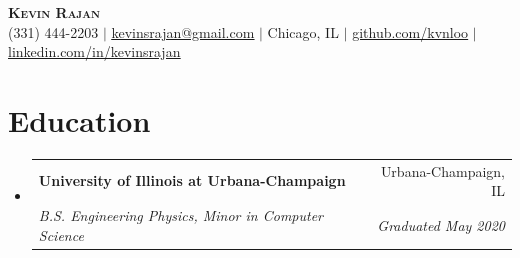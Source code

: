 \documentclass[letterpaper,11pt]{article}
\makeatletter
\newcommand{\resumeSubheading}[4]{%
  \vspace{-2pt}\item
    \begin{tabular*}{0.97\textwidth}[t]{l@{\extracolsep{\fill}}r}
      \textbf{#1} & #2 \\
      \textit{\small#3} & \textit{\small #4} \\
    \end{tabular*}\vspace{-7pt}
}
\newcommand{\resumeSubHeadingListStart}{\begin{itemize}[leftmargin=0.15in, label={}]}
\newcommand{\resumeSubHeadingListEnd}{\end{itemize}}
\makeatother
\begin{document}
\begin{center}
    \textbf{\Huge \scshape Kevin Rajan} \\ \vspace{1pt}
    \small (331) 444-2203 $|$
    \href{mailto:kevinsrajan@gmail.com}{\underline{kevinsrajan@gmail.com}} $|$
    Chicago, IL $|$
    \href{https://github.com/kvnloo}{\underline{github.com/kvnloo}} $|$
    \href{https://linkedin.com/in/kevinsrajan}{\underline{linkedin.com/in/kevinsrajan}}
\end{center}

\section{Education}
  \resumeSubHeadingListStart
    \resumeSubheading
      {University of Illinois at Urbana-Champaign}{Urbana-Champaign, IL}
      {B.S. Engineering Physics, Minor in Computer Science}{Graduated May 2020}
  \resumeSubHeadingListEnd
\end{document}
